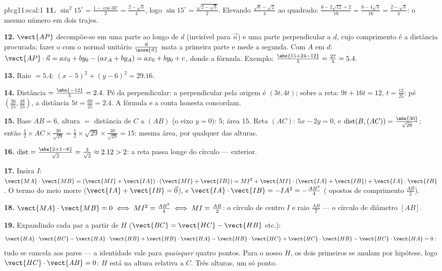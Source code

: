 \begin{solution}{pb:g11:scal:1}
\textbf{11.} $\sin^2 15^\circ = \frac{1 - \cos 30^\circ}{2}
= \frac{2 - \sqrt3}{4}$, logo
$\sin 15^\circ = \frac{\sqrt{2 - \sqrt3}}{2}$. Elevando
$\frac{\sqrt6 - \sqrt2}{4}$ ao quadrado:
$\frac{6 - 2\sqrt{12} + 2}{16} = \frac{8 - 4\sqrt3}{16} =
\frac{2 - \sqrt3}{4}$: o mesmo número em dois trajes.

\textbf{12.} $\vect{AP}$ decompõe-se em uma parte ao longo de
$d$ (invisível para $\vec n$) e uma parte perpendicular a $d$,
cujo comprimento é a distância procurada; fazer o  com o normal unitário $\frac{\vec n}{\norm{\vec n}}$
mata a primeira parte e mede a segunda. Com $A$ em $d$:
$\vect{AP} \cdot \vec n = a x_0 + b y_0 - (a x_A + b y_A) =
a x_0 + b y_0 + c$, donde a fórmula. Exemplo:
$\frac{\abs{15 + 24 - 12}}{5} = \frac{27}{5} = 5.4$.

\textbf{13.} Raio $= 5.4$: $(x - 5)^2 + (y - 6)^2 = 29.16$.

\textbf{14.} Distância $= \frac{\abs{-12}}{5} = 2.4$. Pé da
perpendicular: a perpendicular pela origem é $(3t, 4t)$; sobre
a reta: $9t + 16t = 12$, $t = \frac{12}{25}$: pé
$\left(\frac{36}{25}, \frac{48}{25}\right)$, a distância
$5t = \frac{60}{25} = 2.4$. A fórmula e a conta honesta
concordam.

\textbf{15.} Base $AB = 6$, altura $=$ distância de $C$ a
$(AB)$ (o eixo $y = 0$): $5$; área $15$. Reta $(AC)$:
$5x - 2y = 0$, e
$\operatorname{dist}(B, (AC)) = \frac{\abs{30}}{\sqrt{29}}$;
então $\frac12 \times AC \times \frac{30}{\sqrt{29}} =
\frac12 \times \sqrt{29} \times \frac{30}{\sqrt{29}} = 15$:
mesma área, por qualquer das alturas.

\textbf{16.} $\operatorname{dist} = \frac{\abs{2 + 1 - 6}}
{\sqrt2} = \frac{3}{\sqrt2} \approx 2.12 > 2$: a reta passa
longe do círculo --- exterior.

\textbf{17.} Insira $I$:
$\vect{MA} \cdot \vect{MB} = (\vect{MI} + \vect{IA}) \cdot
(\vect{MI} + \vect{IB}) = MI^2 + \vect{MI} \cdot (\vect{IA} +
\vect{IB}) + \vect{IA} \cdot \vect{IB}$. O termo do meio morre
($\vect{IA} + \vect{IB} = \vec 0$), e
$\vect{IA} \cdot \vect{IB} = -IA^2 = -\frac{AB^2}{4}$ (
opostos de comprimento $\frac{AB}2$).

\textbf{18.} $\vect{MA} \cdot \vect{MB} = 0 \iff MI^2 =
\frac{AB^2}{4} \iff MI = \frac{AB}{2}$: o círculo de centro $I$
e raio $\frac{AB}2$ --- o círculo de diâmetro $[AB]$.

\textbf{19.} Expandindo cada par a partir de $H$
($\vect{BC} = \vect{HC} - \vect{HB}$ etc.):
\[
\vect{HA} \cdot \vect{HC} - \vect{HA} \cdot \vect{HB}
+ \vect{HB} \cdot \vect{HA} - \vect{HB} \cdot \vect{HC}
+ \vect{HC} \cdot \vect{HB} - \vect{HC} \cdot \vect{HA} = 0 :
\]
tudo se cancela aos pares --- a identidade vale para
\emph{quaisquer} quatro pontos. Para o nosso $H$, os dois
primeiros  se anulam por hipótese, logo
$\vect{HC} \cdot \vect{AB} = 0$: $H$ está na altura relativa a
$C$. Três alturas, um só ponto.


\end{solution}
